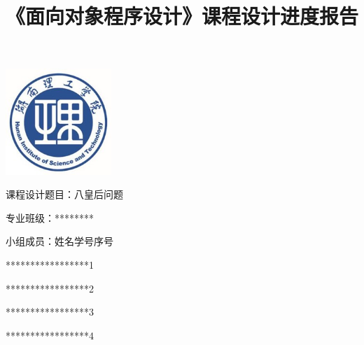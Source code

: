 \documentclass[12pt, a4paper, oneside]{ctexart}
\title{\kaishu\fontsize{22pt}{22pt}\selectfont 《面向对象程序设计》课程设计进度报告}
\date{}
\begin{document}
\maketitle

\vspace{-6em}  %
\centering
\includegraphics[width=0.3\textwidth]{../images/湖南理工学院logo..png}

\begin{flushleft}
\songti\fontsize{18pt}{18pt}\selectfont 课程设计题目：八皇后问题

\vspace{1em}
\songti\fontsize{18pt}{18pt}\selectfont \hspace{2em}专业班级：********

\vspace{1em}
\songti\fontsize{18pt}{18pt}\selectfont \hspace{2em}小组成员：\hspace{0.5em}姓名\hspace{4em}学号\hspace{3.5em}序号

\vspace{1em}
\songti\fontsize{18pt}{18pt}\selectfont \hspace{7em}******\hspace{2em}***********\hspace{2.5em}1

\vspace{1em}
\songti\fontsize{18pt}{18pt}\selectfont \hspace{7em}******\hspace{2em}***********\hspace{2.5em}2

\vspace{1em}
\songti\fontsize{18pt}{18pt}\selectfont \hspace{7em}******\hspace{2em}***********\hspace{2.5em}3

\vspace{1em}
\songti\fontsize{18pt}{18pt}\selectfont \hspace{7em}******\hspace{2em}***********\hspace{2.5em}4


\end{flushleft}
\end{document}
